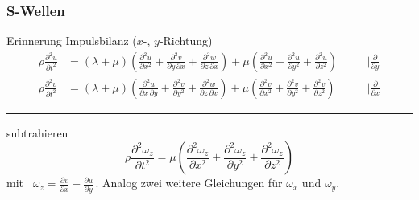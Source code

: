 \begin{frame}
\frametitle{S-Wellen}
Erinnerung Impulsbilanz ($x$-, $y$-Richtung)
\begin{align*}
 \rho \frac{\partial^2 u}{\partial t^2} &= (\lambda + \mu) \left( \frac{\partial^2 u}{\partial x^2} + \frac{\partial^2 v}{\partial y\, \partial x} + \frac{\partial^2 w}{\partial z\,\partial x} \right) + \mu \left( \frac{\partial^2 u}{\partial x^2} + \frac{\partial^2 u}{\partial y^2} + \frac{\partial^2 u}{\partial z^2} \right)
  &\quad& \bigg| \frac{\partial}{\partial y}
 \\
 \rho \frac{\partial^2 v}{\partial t^2} &= (\lambda + \mu) \left( \frac{\partial^2 u}{\partial x\,\partial y} + \frac{\partial^2 v}{\partial y^2} + \frac{\partial^2 w}{\partial z\,\partial x} \right)
 + \mu \left( \frac{\partial^2 v}{\partial x^2} + \frac{\partial^2 v}{\partial y^2} + \frac{\partial^2 v}{\partial z^2} \right)
 &\quad& \bigg| \frac{\partial}{\partial x}
\end{align*}
\hrule \hfill {\small subtrahieren}
\begin{equation*}
\rho \frac{\partial^2 \omega_z }{\partial t^2}
=\mu\left( \frac{\partial^2 \omega_z }{\partial x^2} + \frac{\partial^2 \omega_z }{\partial y^2}
 + \frac{\partial^2 \omega_z }{\partial z^2} \right)
\end{equation*}
mit \ $\omega_z=\frac{\partial v}{\partial x}-\frac{\partial u}{\partial y}$\,. Analog zwei weitere Gleichungen für $\omega_x$ und $\omega_y$.
\end{frame}


